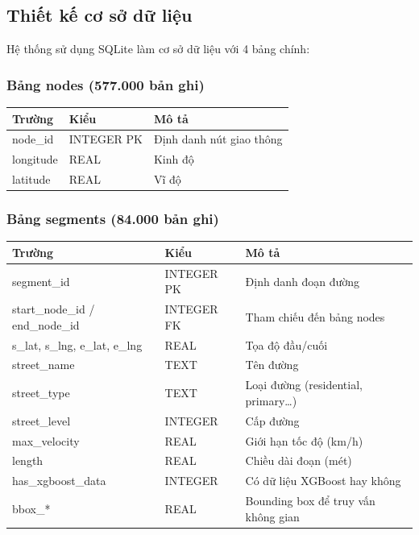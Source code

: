 \documentclass[12pt,a4paper]{article}
\begin{document}
\subsection{Thiết kế cơ sở dữ liệu}
Hệ thống sử dụng SQLite làm cơ sở dữ liệu với 4 bảng chính:

\subsubsection{Bảng nodes (577.000 bản ghi)}
\begin{table}[H]
\centering
\begin{tabularx}{0.7\textwidth}{L{3cm}L{2.5cm}Y}
\toprule
\textbf{Trường} & \textbf{Kiểu} & \textbf{Mô tả} \\
\midrule
node\_id & INTEGER PK & Định danh nút giao thông \\
longitude & REAL & Kinh độ \\
latitude & REAL & Vĩ độ \\
\bottomrule
\end{tabularx}
\end{table}

\subsubsection{Bảng segments (84.000 bản ghi)}
\begin{table}[H]
\centering
\begin{tabularx}{\textwidth}{L{4cm}L{2.5cm}Y}
\toprule
\textbf{Trường} & \textbf{Kiểu} & \textbf{Mô tả} \\
\midrule
segment\_id & INTEGER PK & Định danh đoạn đường \\
start\_node\_id / end\_node\_id & INTEGER FK & Tham chiếu đến bảng nodes \\
s\_lat, s\_lng, e\_lat, e\_lng & REAL & Tọa độ đầu/cuối \\
street\_name & TEXT & Tên đường \\
street\_type & TEXT & Loại đường (residential, primary\ldots) \\
street\_level & INTEGER & Cấp đường \\
max\_velocity & REAL & Giới hạn tốc độ (km/h) \\
length & REAL & Chiều dài đoạn (mét) \\
has\_xgboost\_data & INTEGER & Có dữ liệu XGBoost hay không \\
bbox\_* & REAL & Bounding box để truy vấn không gian \\
\bottomrule
\end{tabularx}
\end{table}
\end{document}
